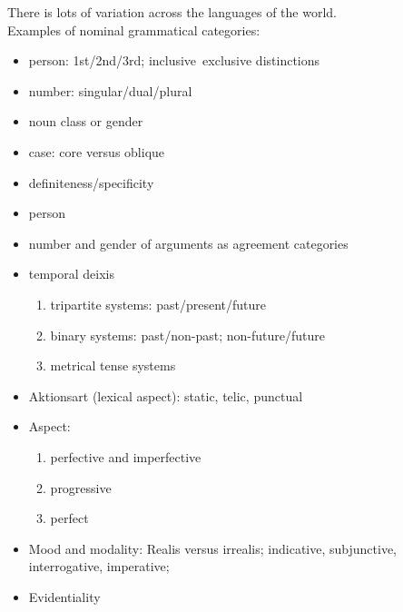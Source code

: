 \documentclass[a4paper,landscape,headrule,footrule]{foils}
\begin{document}
  There is lots of variation across the languages of the world.\\
\vspace{3mm}
Examples of nominal grammatical categories:
  \begin{itemize}
  \item
    person: 1st/2nd/3rd; inclusive~exclusive distinctions
  \item
  number: singular/dual/plural
  \item
 noun class or gender
  \item
case: core versus oblique
  \item
definiteness/specificity
  \end{itemize}


  \begin{itemize}
  \item
    person
  \item
  number and gender of arguments as agreement categories
  \item
 temporal deixis
\begin{enumerate}
	\item tripartite systems: past/present/future
    	\item binary systems: past/non-past; non-future/future
    	\item metrical tense systems
        \end{enumerate}
        \newpage
  \item
Aktionsart (lexical aspect): static, telic, punctual
  \item
Aspect:
\begin{enumerate}
	\item perfective and imperfective
	\item progressive
	\item perfect
\end{enumerate}
\item
Mood and modality:  Realis versus irrealis; indicative, subjunctive, interrogative, imperative;
\item
Evidentiality
  \end{itemize}

\end{document}
